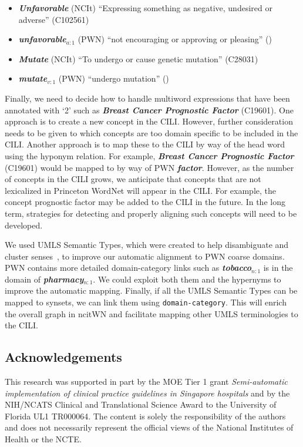 \documentclass[11pt]{article}
\newcommand{\lex}[1]{\textbf{\textit{#1}}}
\begin{document}
\begin{itemize}
\item \lex{Unfavorable} (NCIt) ``Expressing something as negative, undesired or adverse'' (C102561)
\item \lex{unfavorable}$_{a:1}$ (PWN)
``not encouraging or approving or pleasing'' ()
\item \lex{Mutate} (NCIt) ``To undergo or cause genetic mutation'' (C28031)
\item \lex{mutate}$_{v:1}$ (PWN)
``undergo mutation'' ()
\end{itemize}

Finally, we need to decide how to handle multiword expressions that have been annotated with `2' such as \lex{Breast Cancer Prognostic Factor} (C19601). One approach is to create a new concept in the CILI. However, further consideration needs to be given to which concepts are too domain specific to be included in the CILI. Another approach is to map these to the CILI by way of the head word using the hyponym relation. For example, \lex{Breast Cancer Prognostic Factor} (C19601) would be mapped to   by way of PWN \lex{factor}. However, as the number of concepts in the CILI grows, we anticipate that concepts that are not lexicalized in Princeton WordNet will appear in the CILI. For example, the concept prognostic factor may be added to the CILI in the future. In the long term, strategies for detecting and properly aligning such concepts will need to be developed.

We used UMLS Semantic Types, which were created to help disambiguate and cluster senses~\citep{mccray2001aggregating}, to improve our automatic alignment to PWN coarse domains. PWN contains more detailed domain-category links such as \lex{tobacco}$_{n:1}$ is in the domain of \lex{pharmacy}$_{n:1}$.  We could exploit both them and the hypernyms to  improve the automatic mapping.  Finally, if all the UMLS Semantic Types can be mapped to synsets, we can link them using  \texttt{domain-category}.  This will enrich the overall graph in ncitWN and facilitate mapping other UMLS terminologies to the CILI.

\subsection*{Acknowledgements}

This research was supported in part by the MOE Tier 1 grant \textit{Semi-automatic implementation of clinical practice guidelines in Singapore hospitals} and by the NIH/NCATS Clinical and Translational Science Award to the University of Florida UL1 TR000064. The content is solely the responsibility of the authors and does not necessarily represent the official views of the National Institutes of Health or the NCTE.



\end{document}
